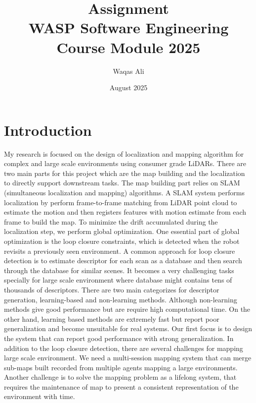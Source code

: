 \documentclass{article}
\title{Assignment \\
WASP Software Engineering Course Module 2025}
\author{Waqas Ali}
\date{August 2025}
\begin{document}
\maketitle

\section{Introduction}

My research is focused on the design of localization and mapping algorithm for complex and large scale environments using consumer grade LiDARs. There are two main parts for this project which are the map building and the localization to directly support downstream tasks. The map building part relies on SLAM (simultaneous localization and mapping) algorithms. A SLAM system performs localization by perform frame-to-frame matching from LiDAR point cloud to estimate the motion and then registers features with motion estimate from each frame to build the map. To minimize the drift accumulated during the localization step, we perform global optimization. One essential part of global optimization is the loop closure constraints, which is detected when the robot revisits a previously seen environment. A common approach for loop closure detection is to estimate descriptor for each scan as a database and then search through the database for similar scenes. It becomes a very challenging tasks specially for large scale environment where database might contains tens of thousands of descriptors. There are two main categorizes for descriptor generation, learning-based and non-learning methods. Although non-learning methods give good performance but are require high computational time. On the other hand, learning based methods are extremely fast but report poor generalization and become unsuitable for real systems. Our first focus is to design the system that can report good performance with strong generalization. In addition to the loop closure detection, there are several challenges for mapping large scale environment. We need a multi-session mapping system that can merge sub-maps built recorded from multiple agents mapping a large environments. Another challenge is to solve the mapping problem as a lifelong system, that requires the maintenance of map to present a consistent representation of the environment with time.   
\end{document}
